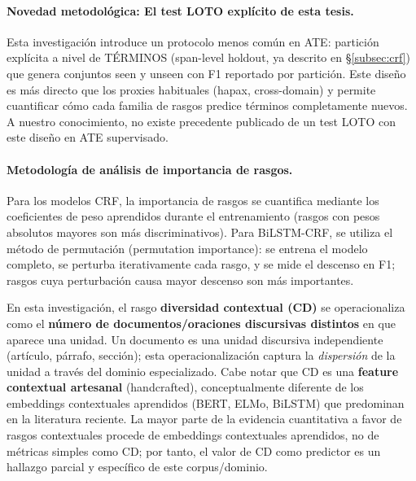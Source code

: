 \paragraph{Novedad metodológica: El test LOTO explícito de esta tesis.}
Esta investigación introduce un protocolo menos común en ATE: partición explícita a nivel de TÉRMINOS (span-level holdout, ya descrito en §\ref{subsec:crf}) que genera conjuntos seen y unseen con F1 reportado por partición. Este diseño es más directo que los proxies habituales (hapax, cross-domain) y permite cuantificar cómo cada familia de rasgos predice términos completamente nuevos. A nuestro conocimiento, no existe precedente publicado de un test LOTO con este diseño en ATE supervisado.

\paragraph{Metodología de análisis de importancia de rasgos.}
Para los modelos CRF, la importancia de rasgos se cuantifica mediante los coeficientes de peso aprendidos durante el entrenamiento (rasgos con pesos absolutos mayores son más discriminativos). Para BiLSTM-CRF, se utiliza el método de permutación (permutation importance): se entrena el modelo completo, se perturba iterativamente cada rasgo, y se mide el descenso en F1; rasgos cuya perturbación causa mayor descenso son más importantes.

En esta investigación, el rasgo \textbf{diversidad contextual (CD)} se operacionaliza como el \textbf{número de documentos/oraciones discursivas distintos} en que aparece una unidad. Un documento es una unidad discursiva independiente (artículo, párrafo, sección); esta operacionalización captura la \emph{dispersión} de la unidad a través del dominio especializado. Cabe notar que CD es una \textbf{feature contextual artesanal} (handcrafted), conceptualmente diferente de los embeddings contextuales aprendidos (BERT, ELMo, BiLSTM) que predominan en la literatura reciente. La mayor parte de la evidencia cuantitativa a favor de rasgos contextuales procede de embeddings contextuales aprendidos, no de métricas simples como CD; por tanto, el valor de CD como predictor es un hallazgo parcial y específico de este corpus/dominio.

